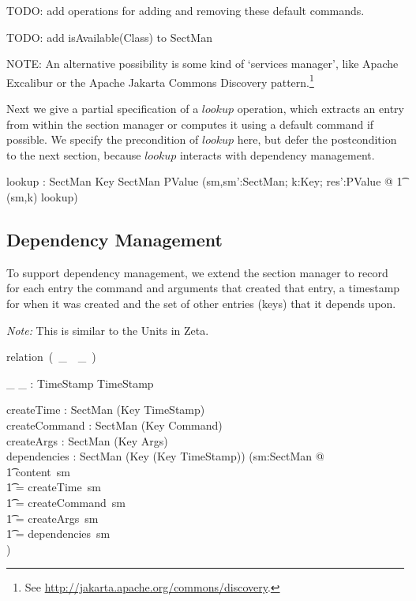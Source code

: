\documentclass{llncs} %
\newcommand{\relation}{\mbox{relation }}
\newcommand{\varg}{~\_~}
\begin{document}
TODO: add operations for adding and removing these default commands. 

TODO: add isAvailable(Class) to SectMan

NOTE: An alternative possibility is some kind of `services manager', like
  Apache Excalibur or the Apache Jakarta Commons Discovery 
  pattern.\footnote{See \url{http://jakarta.apache.org/commons/discovery}.}


Next we give a partial specification of a $lookup$ operation, which
extracts an entry from within the section manager or computes it
using a default command if possible.  We specify the precondition
of $lookup$ here, but defer the postcondition to the next section, because
$lookup$ interacts with dependency management. 

\begin{axdef}
  lookup : SectMan \cross Key \rel SectMan \cross PValue
\where
  (\forall sm,sm':SectMan; k:Key; res':PValue @
  \t1  (sm,k) \in \dom lookup) \\
\end{axdef}


\subsection{Dependency Management} \label{sec:dependency}

To support dependency management, we extend the section
manager to record for each entry the command and arguments
that created that entry, a timestamp for when it was created
and the set of other entries (keys) that it depends upon.

\emph{Note:} This is similar to the Units in Zeta.

\begin{zed}
  [TimeStamp]
\end{zed}

\newcommand{\before}{\ll}
\begin{zed}
  \relation (\varg \before \varg)
\end{zed}

\begin{axdef}
  \_ \before \_ : TimeStamp \rel TimeStamp
\end{axdef} 

\begin{axdef}
  createTime : SectMan \fun (Key \ffun TimeStamp) \\
  createCommand  : SectMan \fun (Key \ffun Command) \\
  createArgs  : SectMan \fun (Key \ffun Args) \\
  dependencies : SectMan \fun (Key \ffun (Key \ffun TimeStamp))
\where
  (\forall sm:SectMan @ \\
  \t1  \dom content~sm \\
  \t1   = \dom createTime~sm \\
  \t1   = \dom createCommand~sm \\
  \t1   = \dom createArgs~sm \\
  \t1   = \dom dependencies~sm \\
  )
\end{axdef}
\end{document}
